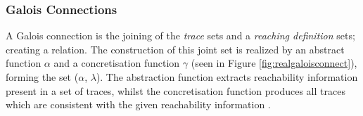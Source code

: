 			\subsubsection*{Galois Connections}
			\par A Galois connection is the joining of the \textit{trace} sets and a \textit{reaching definition} sets; creating a relation. The construction of this joint set is realized by an abstract function $\alpha$
			and a concretisation function $\gamma$ (seen in Figure \ref{fig:realgaloisconnect}), forming the set ($\alpha$, $\lambda$). The abstraction function extracts reachability information present 
			in a set of traces, whilst the concretisation function produces all traces which are consistent with the given reachability information \cite[pp.14--15]{nielson2004principlesofPA}.
			
